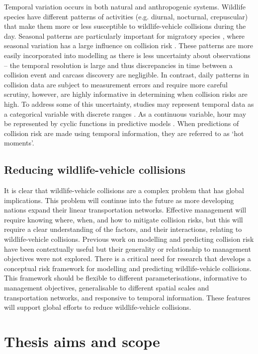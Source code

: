 Temporal variation occurs in both natural and anthropogenic systems. Wildlife species have different patterns of activities (e.g. diurnal, nocturnal, crepuscular) that make them more or less susceptible to wildlife-vehicle collisions during the day. Seasonal patterns are particularly important for migratory species \citep{hick85,bern92}, where seasonal variation has a large influence on collision risk \citep{shep08}. These patterns are more easily incorporated into modelling as there is less uncertainty about observations -- the temporal resolution is large and thus discrepancies in time between a collision event and carcass discovery are negligible. In contrast, daily patterns in collision data are subject to measurement errors and require more careful scrutiny, however, are highly informative in determining when collision risks are high. To address some of this uncertainty, studies may represent temporal data as a categorical variable \citep{mizu14} with discrete ranges \citep{rowd08}. As a continuous variable, hour may be represented by cyclic functions in predictive models \citep{neum12,thur15}. When predictions of collision risk are made using temporal information, they are referred to as `hot moments'.

\subsection{Reducing wildlife-vehicle collisions}

It is clear that wildlife-vehicle collisions are a complex problem that has global implications. This problem will continue into the future as more developing nations expand their linear transportation networks. Effective management will require knowing where, when, and how to mitigate collision risks, but this will require a clear understanding of the factors, and their interactions, relating to wildlife-vehicle collisions. Previous work on modelling and predicting collision risk have been contextually useful but their generality or relationship to management objectives were not explored. There is a critical need for research that develops a conceptual risk framework for modelling and predicting wildlife-vehicle collisions. This framework should be flexible to different parameterisations, informative to management objectives, generalisable to different spatial scales and transportation networks, and responsive to temporal information. These features will support global efforts to reduce wildlife-vehicle collisions.

\section{Thesis aims and scope}

